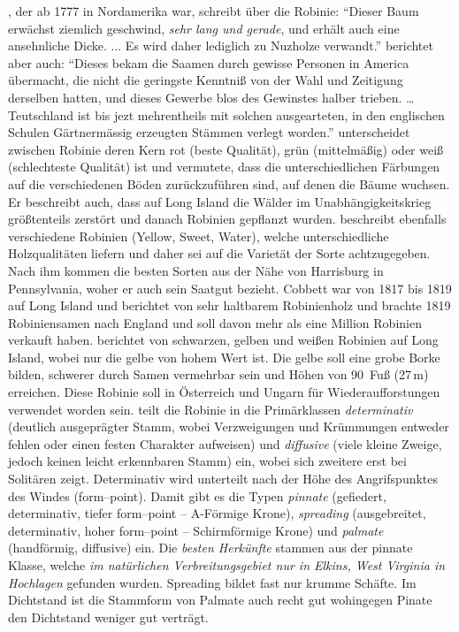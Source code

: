 \documentclass[twocolumn]{scrartcl}
\begin{document}
\citet[S.~67]{wangenheim1781nordamericanischeHolzarten}, der ab 1777
in Nordamerika war, schreibt über die Robinie: \enquote{Dieser Baum
  erwächst ziemlich geschwind, \emph{sehr lang und gerade}, und erhält
  auch eine ansehnliche Dicke. ... Es wird daher lediglich zu Nuzholze
  verwandt.}
\citet[S.~22--23]{wangenheim1781nordamericanischeHolzarten} berichtet
aber auch: \enquote{Dieses bekam die Saamen durch gewisse Personen in
  America übermacht, die nicht die geringste Kenntniß von der Wahl und
  Zeitigung derselben hatten, und dieses Gewerbe blos des Gewinstes
  halber trieben. \dots Teutschland ist bis jezt mehrentheils mit
  solchen ausgearteten, in den englischen Schulen Gärtnermässig
  erzeugten Stämmen verlegt worden.}
\citet[S.~249]{Michaux1813arbres} unterscheidet
zwischen Robinie deren Kern rot (beste Qualität), grün (mittelmäßig)
oder weiß (schlechteste Qualität) ist und vermutete, dass die unterschiedlichen
Färbungen auf die verschiedenen Böden zurückzuführen sind, auf denen die Bäume wuchsen.
Er beschreibt auch, dass auf Long
Island die Wälder im Unabhängigkeitskrieg größtenteils zerstört und
danach Robinien gepflanzt wurden. \citet{cobbett1825woodlands}
beschreibt ebenfalls verschiedene Robinien (Yellow, Sweet, Water),
welche unterschiedliche Holzqualitäten liefern und daher sei auf die
Varietät der Sorte achtzugegeben. Nach ihm kommen die besten
Sorten aus der Nähe von Harrisburg in Pennsylvania, woher er auch
sein Saatgut bezieht. Cobbett war von 1817 bis 1819 auf Long Island
und berichtet von sehr haltbarem Robinienholz und brachte 1819
Robiniensamen nach England und soll davon mehr als eine Million
Robinien verkauft haben. \citet{hicks1883robinie} berichtet von
schwarzen, gelben und weißen Robinien auf Long Island, wobei nur die
gelbe von hohem Wert ist. Die gelbe soll eine grobe Borke bilden,
schwerer durch Samen vermehrbar sein und Höhen von 90~Fuß (27\,m)
erreichen. Diese Robinie soll in Österreich und Ungarn für
Wiederaufforstungen verwendet worden sein. \citet{hopp1941robinie} teilt
die Robinie in die Primärklassen \emph{determinativ} (deutlich ausgeprägter
Stamm, wobei Verzweigungen und Krümmungen entweder fehlen oder
einen festen Charakter aufweisen) und \emph{diffusive} (viele kleine Zweige,
jedoch keinen leicht erkennbaren Stamm) ein, wobei sich zweitere erst
bei Solitären zeigt. Determinativ wird unterteilt nach der Höhe des
Angrifspunktes des Windes (form--point). Damit gibt es die Typen
\emph{pinnate} (gefiedert, determinativ, tiefer form--point --
A-Förmige Krone), \emph{spreading} (ausgebreitet, determinativ, hoher
form--point -- Schirmförmige Krone) und \emph{palmate} (handförmig,
diffusive) ein. Die \emph{besten Herkünfte} stammen aus der pinnate Klasse,
welche \emph{im natürlichen Verbreitungsgebiet nur in Elkins, West Virginia
in Hochlagen} gefunden wurden. Spreading bildet fast nur krumme
Schäfte. Im Dichtstand ist die Stammform von Palmate auch recht gut
wohingegen Pinate den Dichtstand weniger gut verträgt.
\end{document}
